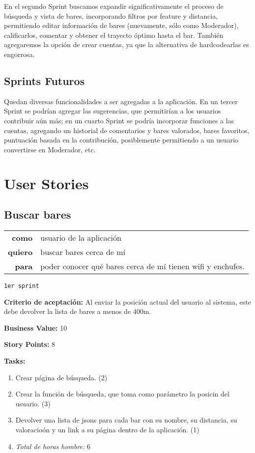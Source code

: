 \documentclass[hidelinks,a4paper,11pt, nofootinbib]{article}
\newcommand{\userstory}[3]{
\begin{tabular}{|r p{10cm}|}
  \hline
  \textbf{como} & #1 \\
  \textbf{quiero} & #2 \\
  \textbf{para} & #3 \\
  \hline
\end{tabular}

}
\newcommand{\critdeacep}[1]{\textbf{Criterio de aceptación:} #1

}
\newcommand{\busvalue}[1]{\textbf{Business Value:} #1

}
\newcommand{\storypoints}[1]{\textbf{Story Points:} #1

}
\newcommand{\primersprint}{\texttt{1er sprint}

}
\newcommand{\tasks}[1]{\textbf{Tasks:} 

#1}
\begin{document}
\par En el segundo Sprint buscamos expandir significativamente el proceso de búsqueda y vista de bares, incorporando filtros por feature y distancia, permitiendo editar información de bares (nuevamente, sólo como Moderador), calificarlos, comentar y obtener el trayecto óptimo hasta el bar.
También agregaremos la opción de crear cuentas, ya que la alternativa de hardcodearlas es engorrosa.

\subsection{Sprints Futuros}

\par Quedan diversas funcionalidades a ser agregadas a la aplicación. 
En un tercer Sprint se podrían agregar las sugerencias, que permitirían a los usuarios contribuir aún más; en un cuarto Sprint se podría incorporar funciones a las cuentas, agregando un historial de comentarios y bares valorados, bares favoritos, puntuación basada en la contribución, posiblemente permitiendo a un usuario convertirse en Moderador, etc. 

\section{User Stories}

\subsection*{Buscar bares}
\userstory{usuario de la aplicación}{buscar bares cerca de mí}{poder conocer qué bares cerca de mí tienen wifi y enchufes.}
\primersprint
\critdeacep{Al enviar la posición actual del usuario al sistema, este debe devolver la lista de bares a menos de 400m.}
\busvalue{10}
\storypoints{8}
\tasks{
  \begin{enumerate}
    \item Crear página de búsqueda. (2)
    \item Crear la función de búsqueda, que toma como parámetro la posicin del usuario. (3)
    \item Devolver una lista de jsons para cada bar con su nombre, su distancia, su valoracioón y un link a su página dentro de la aplicación. (1)
    \item[] \textit{Total de horas hombre:} 6
  \end{enumerate}
}
\end{document}
